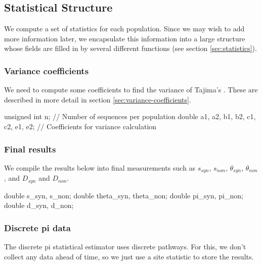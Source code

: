 \documentclass{article}
\begin{document}
    \subsection{Statistical Structure}
      \label{sec:statistical-structure}

      We compute a set of statistics for each population. Since we may wish to
      add more information later, we encapsulate this information into a large
      structure whose fields are filled in by several different functions (see
      section \ref{sec:statistics}).

\begin{ccode}
typedef struct {
\end{ccode}

      \subsubsection{Variance coefficients}

	We need to compute some coefficients to find the variance of Tajima's
	\D{}. These are described in more detail in section
	\ref{sec:variance-coefficients}.

\begin{ccode}
  unsigned int		n;     		// Number of sequences per population
  double		a1, a2, b1, b2,
			c1, c2, e1, e2;	// Coefficients for variance calculation
\end{ccode}

      \subsubsection{Final results}

	We compile the results below into final measurements such as $s_{syn}$,
	$s_{non}$, $\theta_{syn}$, $\theta_{non}$, and $D_{syn}$ and $D_{non}$.

\begin{ccode}
  double		s_syn,		s_non;
  double		theta_syn,	theta_non;
  double		pi_syn,		pi_non;
  double		d_syn,		d_non;
\end{ccode}

      \subsubsection{Discrete pi data}

	The discrete pi statistical estimator uses discrete pathways. For this,
        we don't collect any data ahead of time, so we just use a site statistic
	to store the results.
\end{document}
